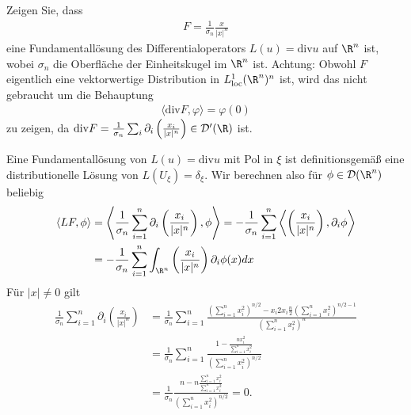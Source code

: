 
\begin{exercise}

Zeigen Sie, dass
\begin{align*}
  F = \frac{1}{\sigma_n}\frac{x}{|x|^n}
\end{align*}
eine Fundamentallösung des Differentialoperators $L(u) = \mathrm{div} u$ auf $\R^n$ ist,
wobei $\sigma_n$ die Oberfläche der Einheitskugel im $\R^n$ ist. Achtung:
Obwohl $F$ eigentlich eine vektorwertige Distribution in $L_{\mathrm{loc}}^1(\R^n)^n$ ist,
wird das nicht gebraucht um die Behauptung
\begin{align*}
  \langle \mathrm{div} F, \varphi \rangle = \varphi(0)
\end{align*}
zu zeigen, da
$\mathrm{div} F = \frac{1}{\sigma_n}\sum_{i}\partial_i\left(\frac{x_i}{|x|^n}\right) \in \mathcal{D}^{\prime}(\R)$
ist.
\end{exercise}


\begin{solution}
Eine Fundamentallösung von $L(u) = \mathrm{div} u$ mit Pol in $\xi$ ist definitionsgemäß
eine distributionelle Lösung von $L(U_{\xi}) = \delta_{\xi}$. Wir berechnen also
für $\phi \in \mathcal{D}(\R^n)$ beliebig
\begin{align*}
  \langle L F, \phi \rangle
  &= \left\langle \frac{1}{\sigma_n}\sum_{i = 1}^n\partial_i\left(\frac{x_i}{|x|^n}\right), \phi \right\rangle
  = -\frac{1}{\sigma_n}\sum_{i = 1}^n\left\langle \left(\frac{x_i}{|x|^n}\right), \partial_i\phi \right\rangle \\
  &= -\frac{1}{\sigma_n}\sum_{i = 1}^n\int_{\R^n}\left(\frac{x_i}{|x|^n}\right)\partial_i\phi(x)dx
\end{align*}
Für $|x| \neq 0$ gilt
\begin{align*}
  \frac{1}{\sigma_n}\sum_{i=1}^n\partial_i\left(\frac{x_i}{|x|^n}\right)
  &= \frac{1}{\sigma_n}\sum_{i=1}^n\frac{\left(\sum_{i=1}^nx_i^2\right)^{n/2} - x_i2x_i\frac{n}{2}\left(\sum_{i=1}^nx_i^2\right)^{n/2 - 1}}{\left(\sum_{i=1}^nx_i^2\right)^n} \\
  &= \frac{1}{\sigma_n}\sum_{i=1}^n\frac{1 - \frac{nx_i^2}{\sum_{i=1}^nx_i^2}}{\left(\sum_{i=1}^nx_i^2\right)^{n/2}} \\
  &= \frac{1}{\sigma_n}\frac{n - n\frac{\sum_{i=1}^nx_i^2}{\sum_{i=1}^nx_i^2}}{\left(\sum_{i=1}^nx_i^2\right)^{n/2}} = 0.
\end{align*}

\end{solution}

